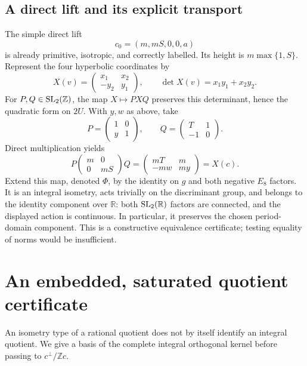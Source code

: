 \documentclass[11pt]{article}
\theoremstyle{remark}\newtheorem{remark}[theorem]{Remark}
\newcommand{\Z}{\mathbb Z}\newcommand{\Q}{\mathbb Q}\newcommand{\R}{\mathbb R}
\begin{document}
\subsection{A direct lift and its explicit transport}
The simple direct lift
\begin{equation}\label{eq:seed}
 c_0=(m,mS,0,0,a)
\end{equation}
is already primitive, isotropic, and correctly labelled. Its height is $m\max\{1,S\}$. Represent the four hyperbolic coordinates by
\[
 X(v)=\begin{pmatrix}x_1&x_2\\-y_2&y_1\end{pmatrix},\qquad \det X(v)=x_1y_1+x_2y_2.
\]
For $P,Q\in\SL_2(\Z)$, the map $X\mapsto PXQ$ preserves this determinant, hence the quadratic form on $2U$. With $y,w$ as above, take
\begin{equation}\label{eq:PQ}
 P=\begin{pmatrix}1&0\\y&1\end{pmatrix},\qquad
 Q=\begin{pmatrix}T&1\\-1&0\end{pmatrix}.
\end{equation}
Direct multiplication yields
\[
 P\begin{pmatrix}m&0\\0&mS\end{pmatrix}Q
 =\begin{pmatrix}mT&m\\-mw&my\end{pmatrix}=X(c).
\]
Extend this map, denoted $\Phi$, by the identity on $g$ and both negative $E_8$ factors. It is an integral isometry, acts trivially on the discriminant group, and belongs to the identity component over $\R$: both $\SL_2(\R)$ factors are connected, and the displayed action is continuous. In particular, it preserves the chosen period-domain component. This is a constructive equivalence certificate; testing equality of norms would be insufficient.

\section{An embedded, saturated quotient certificate}
An isometry type of a rational quotient does not by itself identify an integral quotient. We give a basis of the complete integral orthogonal kernel before passing to $c^\perp/\Z c$.
\end{document}
